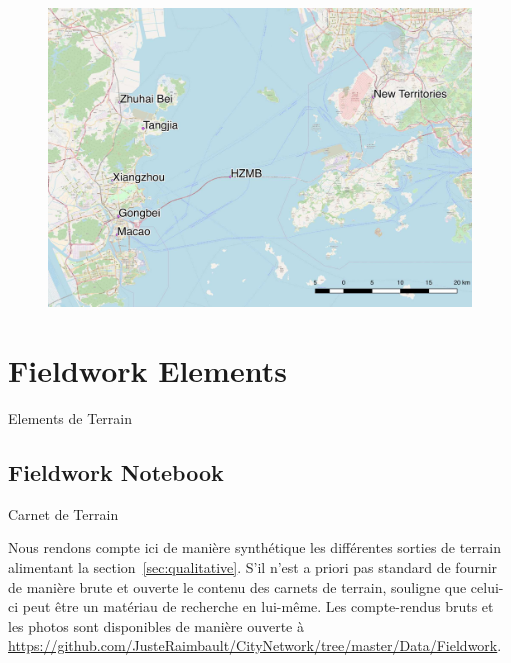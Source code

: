 \begin{figure}
	\includegraphics[width=\linewidth]{Figures/Final/A-casestudies-zhuhai.jpg}	
\end{figure}






\newpage

\section{Fieldwork Elements}{Elements de Terrain}

\label{app:sec:qualitative}



\subsection{Fieldwork Notebook}{Carnet de Terrain}

Nous rendons compte ici de manière synthétique les différentes sorties de terrain alimentant la section~\ref{sec:qualitative}. S'il n'est a priori pas standard de fournir de manière brute et ouverte le contenu des carnets de terrain, \cite{goffman1989fieldwork} souligne que celui-ci peut être un matériau de recherche en lui-même. Les compte-rendus bruts et les photos sont disponibles de manière ouverte à \url{https://github.com/JusteRaimbault/CityNetwork/tree/master/Data/Fieldwork}.



